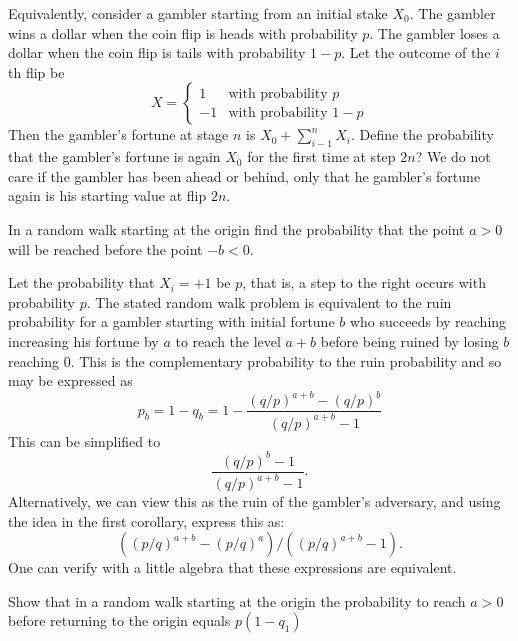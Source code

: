 \begin{solution}
\begin{solution}
\begin{solution}
\begin{solution}
\begin{solution}
\begin{solution}
\begin{solution}
\begin{solution}
{\begin{problem}
  Equivalently, consider a gambler starting from an initial stake $X_0$.
  The gambler wins a dollar when the coin flip is heads with
  probability $p$.  The gambler loses a dollar when the coin flip is
  tails with probability $1-p$. Let the outcome of the $i$th flip be 
  \[
      X = 
      \begin{cases}
	1  &  \text{with probability $p$} \\
        -1 &  \text{with probability $1-p$}
      \end{cases}
   \]
   Then the gambler's fortune at stage $n$ is $X_0 + \sum_{i-1}^n
   X_i.$ Define the probability that the gambler's fortune is again $X_0$ 
   for the first time at step $2n$?  We do not care if the gambler has been 
   ahead or behind, only that he gambler's fortune again is his starting value 
   at flip $2n$.
\end{problem} 
\begin{solution} 

\end{solution}

\begin{problem}
 In a random walk starting at the origin find the probability
    that the point $a > 0$ will be reached before the point $-b < 0$.
\end{problem} 
\begin{solution} 

Let the probability that $X_i = +1$ be $p$, that is, a step to the
right occurs with probability $p$.
The stated random walk problem is equivalent to the
ruin probability for a gambler starting
with initial fortune $b$ who succeeds by reaching increasing
his fortune by $a$ to reach the level 
$a + b$ before being ruined by losing $b$ reaching 0.  This is the
complementary probability to the ruin probability and so may
be expressed as 
\[
  p_b = 1 - q_b 
      = 1 - \frac{ (q/p)^{a+b} - (q/p)^{b}}{(q/p)^{a+b} - 1}
\]
This can be simplified to 
\[ 
   \frac{ (q/p)^b - 1}{ (q/p)^{a+b} - 1}.
\]
Alternatively, we can view this as the ruin of the gambler's
adversary, and using the idea in the first corollary, express
this as:
\[
( (p/q)^{a+b} - (p/q)^{a} )/( (p/q)^{a+b} - 1 ).
\]
One can verify with a little algebra that these expressions
are equivalent. 
\end{solution}

\begin{problem}
 Show that in a random walk starting at the origin the
    probability to reach  $a>0$ before returning to the origin
    equals $p(1-q_1)$
\end{problem} 
\begin{solution} 


\end{solution}}
\end{solution}
\end{solution}
\end{solution}
\end{solution}
\end{solution}
\end{solution}
\end{solution}
\end{solution}
